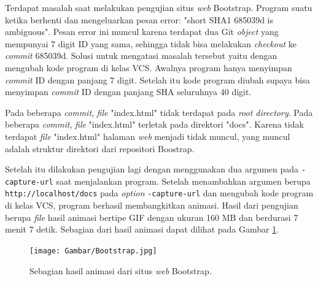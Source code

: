 \begin{enumerate}


Terdapat masalah saat melakukan pengujian situs \textit{web} Bootstrap. Program suatu ketika berhenti dan mengeluarkan pesan error: "short SHA1 685039d is ambiguous". Pesan error ini muncul karena terdapat dua Git \textit{object} yang mempunyai 7 digit ID yang sama, sehingga tidak bisa melakukan \textit{checkout} ke \textit{commit} 685039d. Solusi untuk mengatasi masalah tersebut yaitu dengan mengubah kode program di kelas VCS. Awalnya program hanya menyimpan \textit{commit} ID dengan panjang 7 digit. Setelah itu kode program diubah supaya bisa menyimpan \textit{commit} ID dengan panjang SHA seluruhnya 40 digit.

Pada beberapa \textit{commit}, \textit{file} "index.html" tidak terdapat pada \textit{root directory}. Pada beberapa \textit{commit}, \textit{file} "index.html" terletak pada direktori "docs". Karena tidak terdapat \textit{file} "index.html" halaman \textit{web} menjadi tidak muncul, yang muncul adalah struktur direktori dari repositori Boostrap. 

Setelah itu dilakukan pengujian lagi dengan menggunakan dua argumen pada \texttt{-capture-url}  saat menjalankan program. Setelah menambahkan argumen berupa \texttt{http://localhost/docs} pada \textit{option} \texttt{-capture-url} dan mengubah kode program di kelas VCS, program berhasil membangkitkan animasi. Hasil dari pengujian berupa \textit{file} hasil animasi bertipe GIF dengan ukuran 160 MB dan berdurasi 7 menit 7 detik. Sebagian dari hasil animasi dapat dilihat pada Gambar \ref{fig:hasil_bootstrap}.


\begin{figure}[H]	
		\texttt{[image: Gambar/Bootstrap.jpg]}
	\caption{Sebagian hasil animasi dari situs \textit{web} Bootstrap.}
	\label{fig:hasil_bootstrap}
\end{figure}




\end{enumerate}
